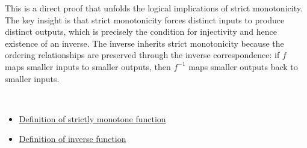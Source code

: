 \begin{remark*}
This is a direct proof that unfolds the logical implications of strict monotonicity. The key insight is that strict monotonicity forces distinct inputs to produce distinct outputs, which is precisely the condition for injectivity and hence existence of an inverse. The inverse inherits strict monotonicity because the ordering relationships are preserved through the inverse correspondence: if $f$ maps smaller inputs to smaller outputs, then $f^{-1}$ maps smaller outputs back to smaller inputs.
\end{remark*}

\begin{remark*}[Dependencies]~\\
\begin{itemize}
  \item \hyperref[def:strictly-monotone]{Definition of strictly monotone function}
  \item \hyperref[def:inverse-function]{Definition of inverse function}
\end{itemize}
\end{remark*}
